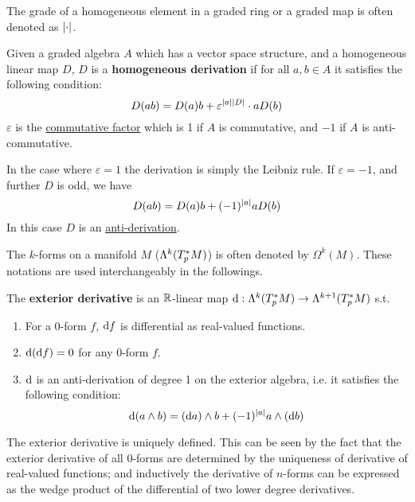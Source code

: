 \documentclass{article}
\begin{document}
\begin{notation}
    The grade of a homogeneous element in a graded ring or a graded map is often denoted as $\left|\cdot\right|$.
\end{notation}

\begin{definition}
    Given a graded algebra $A$ which has a vector space structure, and a homogeneous linear map $D$, $D$ is a \textbf{homogeneous derivation} if for all $a, b \in A$ it satisfies the following condition:
    \[
        D(ab) = D(a)b + \varepsilon^{\left|a\right|\left|D\right|} \cdot aD(b)
    \]
    $\varepsilon$ is the \underline{commutative factor} which is 1 if $A$ is commutative, and $-1$ if $A$ is anti-commutative. 
\end{definition}

\begin{remark}
    In the case where $\varepsilon = 1$ the derivation is simply the Leibniz rule. If $\varepsilon = -1$, and further $D$ is odd, we have
    \[
        D(ab) = D(a)b + (-1)^{\left|a\right|} aD(b)
    \]
    In this case $D$ is an \underline{anti-derivation}.
\end{remark}

\begin{notation}
    The $k$-forms on a manifold $M$ ($\Lambda^k(T_p^{\ast} M)$) is often denoted by $\Omega^k(M)$. These notations are used interchangeably in the followings. 
\end{notation}

\begin{definition}
    The \textbf{exterior derivative} is an $\mathbb{R}$-linear map $\mathrm{d}: \Lambda^k(T_p^{\ast} M) \to \Lambda^{k + 1}(T_p^{\ast} M)$ s.t.
    \begin{enumerate}[label=\arabic*)]
        \item For a 0-form $f$, $\mathrm{d} f$ is differential as real-valued functions.
        \item $\mathrm{d}(\mathrm{d} f) = 0$ for any 0-form $f$.
        \item $\mathrm{d}$ is an anti-derivation of degree 1 on the exterior algebra, i.e. it satisfies the following condition:
        \[
            \mathrm{d}(a \wedge b) = (\mathrm{d} a) \wedge b + (-1)^{\left|a\right|} a \wedge (\mathrm{d} b)
        \]
    \end{enumerate}
\end{definition}

\begin{remark}
    The exterior derivative is uniquely defined. This can be seen by the fact that the exterior derivative of all $0$-forms are determined by the uniqueness of derivative of real-valued functions; and inductively the derivative of $n$-forms can be expressed as the wedge product of the differential of two lower degree derivatives. 
\end{remark}
\end{document}
